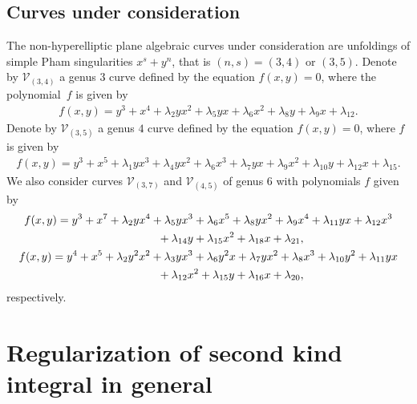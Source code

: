 \documentclass[pdftex]{sigma}
\numberwithin{equation}{section}
\begin{document}
\subsection{Curves under consideration}
The non-hyperelliptic plane algebraic curves under consideration are unfoldings of simple Pham singularities $x^s + y^n$, that is $(n,s)=(3,4)$ or $(3,5)$. Denote by $\mathcal{V}_{(3,4)}$ a genus $3$ curve defined by the equation $f(x,y)=0$, where the polynomial~$f$ is given by
\begin{gather}\label{C34eq}
f(x,y) = y^3 + x^4 + \lambda_2 y x^2 + \lambda_5 y x + \lambda_6 x^2 + \lambda_8 y + \lambda_9 x + \lambda_{12}.
\end{gather}
Denote by $\mathcal{V}_{(3,5)}$ a genus $4$ curve defined by the equation $f(x,y)=0$, where
$f$ is given by
\begin{gather}\label{C35eq}
 f(x,y) = y^3 + x^5 + \lambda_1 y x^3 + \lambda_4 y x^2 + \lambda_6 x^3 + \lambda_7 y x + \lambda_9 x^2 + \lambda_{10} y + \lambda_{12} x + \lambda_{15}.
\end{gather}
We also consider curves $\mathcal{V}_{(3,7)}$ and $\mathcal{V}_{(4,5)}$ of genus 6 with polynomials $f$ given by
\begin{gather*}
f(x,y) = y^3 + x^7 + \lambda_2 y x^4 + \lambda_5 y x^3 + \lambda_6 x^5 + \lambda_8 y x^2 + \lambda_9 x^4 + \lambda_{11} y x + \lambda_{12} x^3 \\
\hphantom{f(x,y) =}{} + \lambda_{14} y + \lambda_{15} x^2 + \lambda_{18} x + \lambda_{21},\\
f(x,y) = y^4 + x^5 + \lambda_2 y^2 x^2 + \lambda_3 y x^3 +\lambda_6 y^2 x+\lambda_7 y x^2 + \lambda_8 x^3 +\lambda_{10} y^2 +\lambda_{11} y x \\
\hphantom{f(x,y) =}{} + \lambda_{12} x^2 + \lambda_{15} y + \lambda_{16} x + \lambda_{20},
\end{gather*}
respectively.

\section{Regularization of second kind integral in general}\label{s:RegInt}
\end{document}
